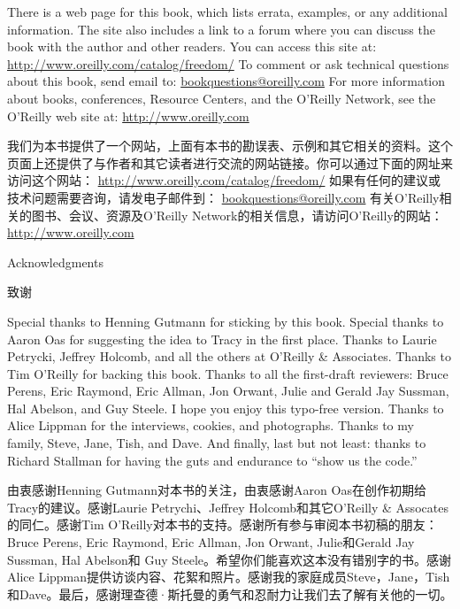 \ifdefined\eng
There is a web page for this book, which lists errata, examples, or any additional information. The site also includes a link to a forum where you can discuss the book with the author and other readers. You can access this site at:
\url{http://www.oreilly.com/catalog/freedom/}
To comment or ask technical questions about this book, send email to:
\url{bookquestions@oreilly.com}
For more information about books, conferences, Resource Centers, and the O'Reilly Network, see the O'Reilly web site at:
\url{http://www.oreilly.com}
\fi

\ifdefined\chs
我们为本书提供了一个网站，上面有本书的勘误表、示例和其它相关的资料。这个页面上还提供了与作者和其它读者进行交流的网站链接。你可以通过下面的网址来访问这个网站：
\url{http://www.oreilly.com/catalog/freedom/}
如果有任何的建议或技术问题需要咨询，请发电子邮件到：
\url{bookquestions@oreilly.com}
有关O'Reilly相关的图书、会议、资源及O'Reilly Network的相关信息，请访问O'Reilly的网站：
\url{http://www.oreilly.com}
\fi

\ifdefined\eng
Acknowledgments
\fi

\ifdefined\chs
致谢
\fi

\ifdefined\eng
Special thanks to Henning Gutmann for sticking by this book. Special thanks to Aaron Oas for suggesting the idea to Tracy in the first place. Thanks to Laurie Petrycki, Jeffrey Holcomb, and all the others at O'Reilly \& Associates. Thanks to Tim O'Reilly for backing this book. Thanks to all the first-draft reviewers: Bruce Perens, Eric Raymond, Eric Allman, Jon Orwant, Julie and Gerald Jay Sussman, Hal Abelson, and Guy Steele. I hope you enjoy this typo-free version. Thanks to Alice Lippman for the interviews, cookies, and photographs. Thanks to my family, Steve, Jane, Tish, and Dave. And finally, last but not least: thanks to Richard Stallman for having the guts and endurance to ``show us the code.''
\fi

\ifdefined\chs
由衷感谢Henning Gutmann对本书的关注，由衷感谢Aaron Oas在创作初期给Tracy的建议。感谢Laurie Petrychi、Jeffrey Holcomb和其它O'Reilly \& Assocates的同仁。感谢Tim O'Reilly对本书的支持。感谢所有参与审阅本书初稿的朋友：Bruce Perens, Eric Raymond, Eric Allman, Jon Orwant, Julie和Gerald Jay Sussman, Hal Abelson和 Guy Steele。希望你们能喜欢这本没有错别字的书。感谢Alice Lippman提供访谈内容、花絮和照片。感谢我的家庭成员Steve，Jane，Tish和Dave。最后，感谢理查德·斯托曼的勇气和忍耐力让我们去了解有关他的一切。
\fi

\theendnotes
\setcounter{endnote}{0}
